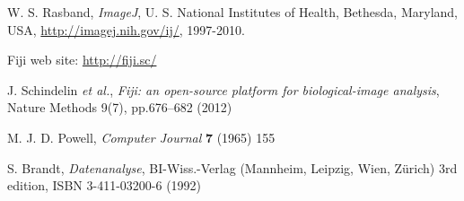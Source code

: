 \documentclass[fleqn]{scrartcl}
\begin{document}

 W. S. Rasband, \textit{ImageJ}, U. S. National
  Institutes of Health, Bethesda, Maryland, USA,
  \url{http://imagej.nih.gov/ij/}, 1997-2010.

 Fiji web site: \url{http://fiji.sc/}

 J. Schindelin \textit{et al.}, \textit{Fiji: an
    open-source platform for biological-image analysis}, Nature
  Methods 9(7), pp.676--682 (2012)

 M. J. D. Powell, \textit{Computer Journal}
  \textbf{7} (1965) 155

 S. Brandt, \textit{Datenanalyse}, BI-Wiss.-Verlag
  (Mannheim, Leipzig, Wien, Zürich) 3rd edition, ISBN 3-411-03200-6
  (1992)
\end{document}
